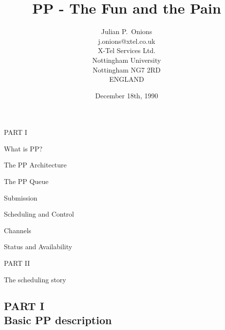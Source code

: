 

\raggedright


\title	{PP - The Fun and the Pain}

\author{Julian P.~Onions\\
j.onions@xtel.co.uk\\[.5in]
X-Tel Services Ltd.\\
Nottingham University\\
Nottingham NG7 2RD\\
ENGLAND}

\date	{December 18th, 1990}

\maketitle

\begin{bwslide}
PART I
\begin{nrtc}
\item	What is PP?

\item	The PP Architecture

\item	The PP Queue

\item	Submission

\item	Scheduling and Control

\item	Channels

\item	Status and Availability
\end{nrtc}
PART II
\begin{nrtc}
\item The scheduling story
\end{nrtc}
\end{bwslide}

\begin{bwslide}
\part*{PART I\\
Basic PP description}
\end{bwslide}

